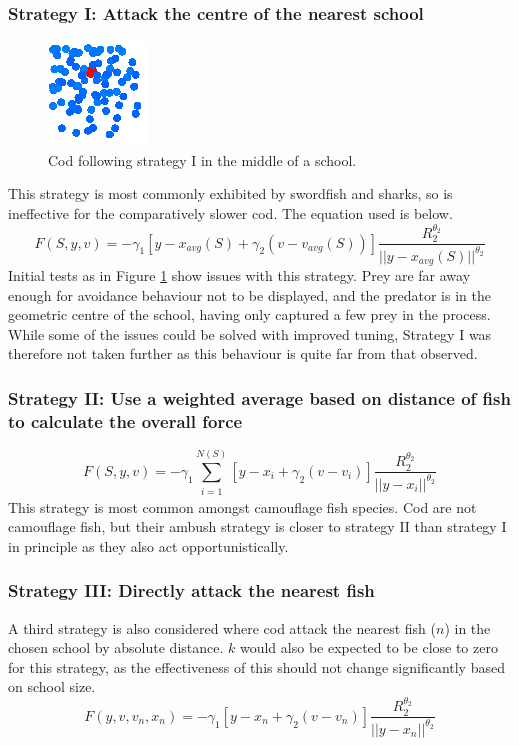 \documentclass[12pt]{article}
\begin{document}
\subsubsection{Strategy I: Attack the centre of the nearest school}
\begin{figure}
    \centering
    \includegraphics[width=0.25\linewidth]{fig/strategy_1_problem.png}
    \caption{Cod following strategy I in the middle of a school. }
    \label{fig:strat_1_problem}
\end{figure}
This strategy is most commonly exhibited by swordfish and sharks\supercite{pavlov2000behavior}, so is ineffective for the comparatively slower cod. The equation used is below.\supercite{HartonoNguyenTa2024}
\begin{equation}
    F(S,y,v) = -\gamma_1[y-x_{avg}(S)+\gamma_2(v-v_{avg}(S))]\frac{R_2^{\theta_2}}{||y-x_{avg}(S)||^{\theta_2}}
\end{equation}
Initial tests as in Figure \ref{fig:strat_1_problem} show issues with this strategy. Prey are far away enough for avoidance behaviour not to be displayed, and the predator is in the geometric centre of the school, having only captured a few prey in the process. While some of the issues could be solved with improved tuning, Strategy I was therefore not taken further as this behaviour is quite far from that observed.
\subsubsection{Strategy II: Use a weighted average based on distance of fish to calculate the overall force }
\begin{equation}
    F(S,y,v) = -\gamma_1 \sum_{\substack{i=1}}^{N(S)} [y-x_i+\gamma_2(v-v_i)]\frac{R_2^{\theta_2}}{||y-x_i||^{\theta_2}}
\end{equation}
This strategy is most common amongst camouflage fish species\supercite{HartonoNguyenTa2024}. Cod are not camouflage fish, but their ambush strategy is closer to strategy II than strategy I in principle as they also act opportunistically.
\subsubsection{Strategy III: Directly attack the nearest fish}
A third strategy is also considered where cod attack the nearest fish ($n$) in the chosen school by absolute distance. $k$ would also be expected to be close to zero for this strategy, as the effectiveness of this should not change significantly based on school size.
\begin{equation}
    F(y,v,v_n,x_n) = -\gamma_1[y-x_n+\gamma_2(v-v_n)]\frac{R_2^{\theta_2}}{||y-x_n||^{\theta_2}}
\end{equation}
\end{document}

